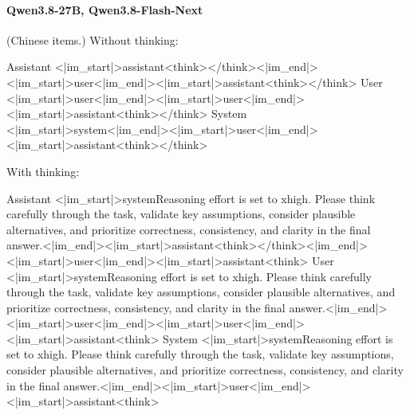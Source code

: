 \paragraph{Qwen3.8-27B, Qwen3.8-Flash-Next} (Chinese items.)
\noindent Without thinking:
\begin{Rendering}
Assistant  <|im_start|>assistant\NL{}<think>\NL{}\NL{}</think>\NL{}\NL{}<|im_end|>\NL{}<|im_start|>user\NL{}<|im_end|>\NL{}<|im_start|>assistant\NL{}<think>\NL{}\NL{}</think>\NL{}\NL{}
User       <|im_start|>user\NL{}<|im_end|>\NL{}<|im_start|>user\NL{}<|im_end|>\NL{}<|im_start|>assistant\NL{}<think>\NL{}\NL{}</think>\NL{}\NL{}
System     <|im_start|>system\NL{}<|im_end|>\NL{}<|im_start|>user\NL{}<|im_end|>\NL{}<|im_start|>assistant\NL{}<think>\NL{}\NL{}</think>\NL{}\NL{}
\end{Rendering}
\noindent With thinking:
\begin{Rendering}
Assistant  <|im_start|>system\NL{}Reasoning effort is set to xhigh. Please think carefully through the task, validate key assumptions, consider plausible alternatives, and prioritize correctness, consistency, and clarity in the final answer.<|im_end|>\NL{}<|im_start|>assistant\NL{}<think>\NL{}\NL{}</think>\NL{}\NL{}<|im_end|>\NL{}<|im_start|>user\NL{}<|im_end|>\NL{}<|im_start|>assistant\NL{}<think>\NL{}
User       <|im_start|>system\NL{}Reasoning effort is set to xhigh. Please think carefully through the task, validate key assumptions, consider plausible alternatives, and prioritize correctness, consistency, and clarity in the final answer.<|im_end|>\NL{}<|im_start|>user\NL{}<|im_end|>\NL{}<|im_start|>user\NL{}<|im_end|>\NL{}<|im_start|>assistant\NL{}<think>\NL{}
System     <|im_start|>system\NL{}Reasoning effort is set to xhigh. Please think carefully through the task, validate key assumptions, consider plausible alternatives, and prioritize correctness, consistency, and clarity in the final answer.\NL{}\NL{}<|im_end|>\NL{}<|im_start|>user\NL{}<|im_end|>\NL{}<|im_start|>assistant\NL{}<think>\NL{}
\end{Rendering}
